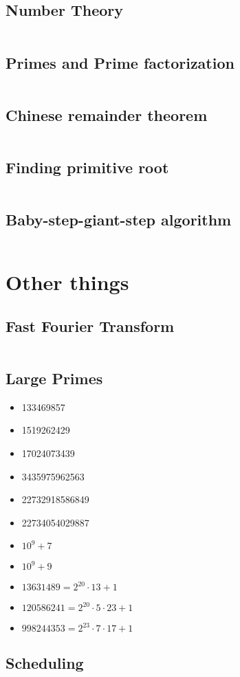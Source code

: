 \documentclass[8pt,a4paper,landscape,oneside]{amsart}
\newcommand{\codec}[1]{\inputminted[fontsize=\large,tabsize=2,baselinestretch=1]{cpp}{code/#1}}
\newcommand{\codep}[1]{\inputminted[fontsize=\large,tabsize=2,baselinestretch=1]{py}{code/#1}}
\begin{document}
\begin{multicols*}{2}
\begin{large}
\subsection{Number Theory}
\codep{gcdbezout.py}
\subsection{Primes and Prime factorization}
\codep{primecalc.py}
\subsection{Chinese remainder theorem}
\codep{crt.py}
\subsection{Finding primitive root}
\codep{primitiveroot.py}
\subsection{Baby-step-giant-step algorithm}
\codep{babystepgiantstep.py}
\section{Other things}
\subsection{Fast Fourier Transform}
\codec{fft.cpp}
\subsection{Large Primes}
\begin{itemize}
    \item 133469857
    \item 1519262429
    \item 17024073439
    \item 3435975962563
    \item 22732918586849
    \item 22734054029887
    \item $10^9+7$
    \item $10^9+9$
    \item $13631489 = 2^{20}\cdot 13 + 1$
    \item $120586241 = 2^{20}\cdot 5\cdot 23 + 1$
    \item $998244353 = 2^{23}\cdot 7\cdot 17 + 1$
\end{itemize}
\subsection{Scheduling}
\codec{scheduling.cpp}

\end{large}
\end{multicols*}
\end{document}
